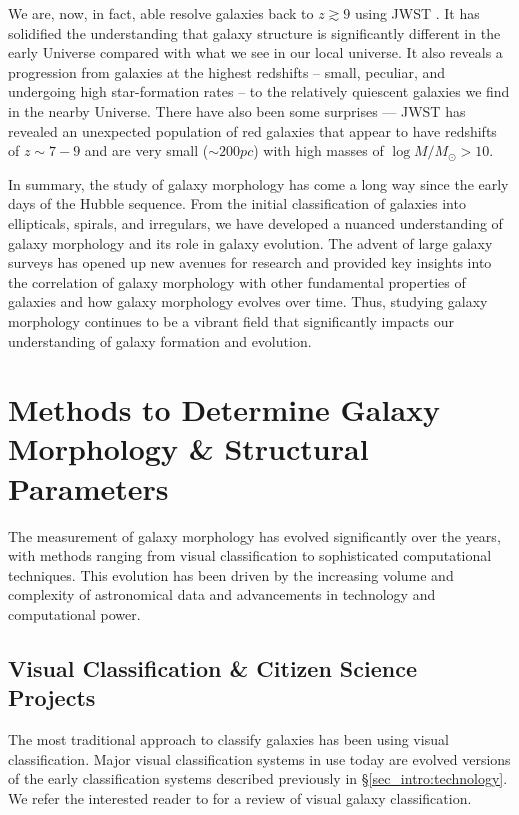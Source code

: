 We are, now, in fact, able resolve galaxies back to $z \gtrsim 9$ using JWST \citep[e.g.,][]{labbe_23,finkelstein_23, kartaltepe_23}. It has solidified the understanding that galaxy structure is significantly different in the early Universe compared with what we see in our local universe. It also reveals a progression from galaxies at the highest redshifts -- small, peculiar, and undergoing high star-formation rates -- to the relatively quiescent galaxies we find in the nearby Universe. There have also been some surprises --- JWST has revealed an unexpected population of red galaxies that appear to have redshifts of $z \sim 7 − 9$ and are very small ($\sim 200 pc$) with high masses of $\log M/M_{\odot} > 10$.

In summary, the study of galaxy morphology has come a long way since the early days of the Hubble sequence. From the initial classification of galaxies into ellipticals, spirals, and irregulars, we have developed a nuanced understanding of galaxy morphology and its role in galaxy evolution. The advent of large galaxy surveys has opened up new avenues for research and provided key insights into the correlation of galaxy morphology with other fundamental properties of galaxies and how galaxy morphology evolves over time. Thus, studying galaxy morphology continues to be a vibrant field that significantly impacts our understanding of galaxy formation and evolution. 


\section{Methods to Determine Galaxy Morphology \& Structural Parameters} \label{sec_intro:determining_morph}

The measurement of galaxy morphology has evolved significantly over the years, with methods ranging from visual classification to sophisticated computational techniques. This evolution has been driven by the increasing volume and complexity of astronomical data and advancements in technology and computational power.

\subsection{Visual Classification \& Citizen Science Projects} \label{sec_intro:trad_morph}

The most traditional approach to classify galaxies has been using visual classification. Major visual classification systems in use today are evolved versions of the early classification systems described previously in \S \ref{sec_intro:technology}. We refer the interested reader to \citet{buta_13} for a review of visual galaxy classification. 

